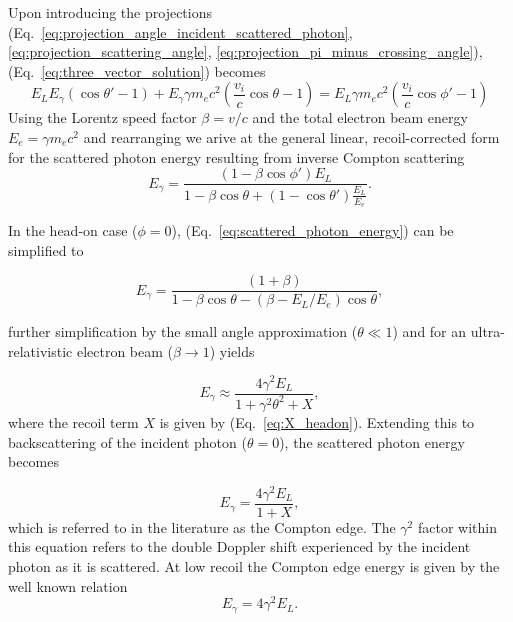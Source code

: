 \documentclass[../main.tex]{subfiles}
\begin{document}
Upon introducing the projections (Eq.~\ref{eq:projection_angle_incident_scattered_photon}, \ref{eq:projection_scattering_angle}, \ref{eq:projection_pi_minus_crossing_angle}), (Eq.~\ref{eq:three_vector_solution}) becomes
\begin{equation}
E_{L}E_{\gamma}\left(\cos\theta'-1\right)+E_{\gamma}\gamma m_{e}c^{2}\left(\frac{v_{i}}{c}\cos\theta-1\right) = E_{L}\gamma m_{e}c^{2}\left( \frac{v_{i}}{c}\cos\phi'-1\right)
\label{eq:three_vector_solution_projections}
\end{equation}
Using the Lorentz speed factor $\beta = v/c$ and the total electron beam energy $E_{e} = \gamma m_{e}c^{2}$ and rearranging we arive at the general linear, recoil-corrected form for the scattered photon energy resulting from inverse Compton scattering 
\begin{equation}
E_{\gamma} = \frac{\left(1-\beta\cos\phi'\right)E_{L}}{1-\beta\cos\theta+\left(1-\cos\theta'\right)\frac{E_{L}}{E_{e}}}. 
\label{eq:scattered_photon_energy}
\end{equation}
  
In the head-on case ($\phi=0$), (Eq.~\ref{eq:scattered_photon_energy}) can be simplified to 

\begin{equation}
E_{\gamma} = \frac{\left(1+\beta\right)}{1-\beta\cos\theta-\left(\beta-E_{L}/E_{e}\right)\cos\theta},
\label{eq:headon_scattered_photon_energy}
\end{equation}

further simplification by the small angle approximation ($\theta \ll 1$) and for an ultra-relativistic electron beam ($\beta \rightarrow 1$) yields

\begin{equation}
E_{\gamma} \approx \frac{4\gamma^{2}E_{L}}{1+\gamma^{2}\theta^{2}+X},    
\label{eq:small_angle_scattered_photon_energy}
\end{equation}
where the recoil term $X$ is given by (Eq.~\ref{eq:X_headon}). Extending this to backscattering of the incident photon ($\theta = 0$), the scattered photon energy becomes

\begin{equation}
E_{\gamma} = \frac{4\gamma^{2}E_{L}}{1+X},
\label{eq:headon_backscattering_scattered_photon_energy}
\end{equation}
which is referred to in the literature \cite{krafft2010compton} as the Compton edge. The $\gamma^{2}$ factor within this equation refers to the double Doppler shift experienced by the incident photon as it is scattered. At low recoil the Compton edge energy is given by the well known relation
\begin{equation}
E_{\gamma} = 4\gamma^{2}E_{L}.
\label{eq:compton_edge_energy}    
\end{equation}
\end{document}
